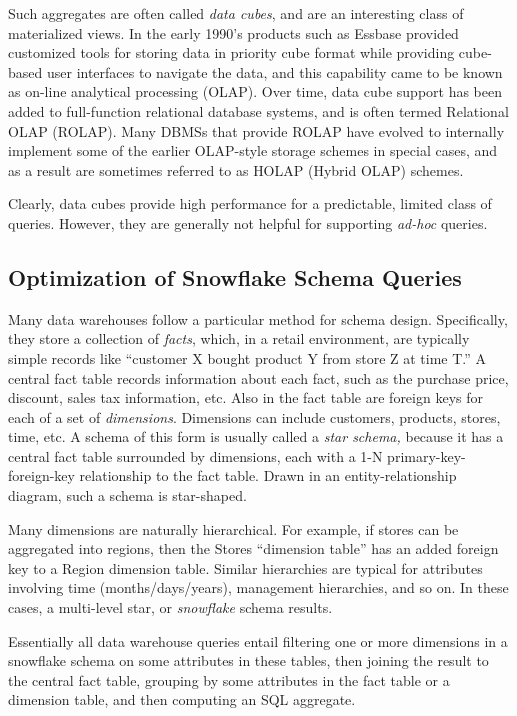 \documentclass[b5paper,11pt,twoside,openright]{book}
\begin{document}
Such aggregates are often called \emph{data cubes}, and are an
interesting class of materialized views. In the early 1990's products
such as Essbase provided customized tools for storing data in priority
cube format while providing cube-based user interfaces to navigate the
data, and this capability came to be known as on-line analytical
processing (OLAP). Over time, data cube support has been added to
full-function relational database systems, and is often termed
Relational OLAP (ROLAP). Many DBMSs that provide ROLAP have evolved to
internally implement some of the earlier OLAP-style storage schemes in
special cases, and as a result are sometimes referred to as HOLAP
(Hybrid OLAP) schemes.

Clearly, data cubes provide high performance for a predictable, limited
class of queries. However, they are generally not helpful for
supporting \emph{ad-hoc} queries.

\hypertarget{optimization-of-snowflake-schema-queries}{%
\subsection{Optimization of Snowflake Schema
Queries}\label{optimization-of-snowflake-schema-queries}}

Many data warehouses follow a particular method for schema design.
Specifically, they store a collection of \emph{facts}, which, in a
retail environment, are typically simple records like ``customer X
bought product Y from store Z at time T.'' A central fact table records
information about each fact, such as the purchase price, discount, sales
tax information, etc. Also in the fact table are foreign keys for each
of a set of \emph{dimensions}. Dimensions can include customers,
products, stores, time, etc. A schema of this form is usually called a
\emph{star schema,} because it has a central fact table surrounded by
dimensions, each with a 1-N primary-key-foreign-key relationship to the
fact table. Drawn in an entity-relationship diagram, such a schema is
star-shaped.

Many dimensions are naturally hierarchical. For example, if stores can
be aggregated into regions, then the Stores ``dimension table'' has an
added foreign key to a Region dimension table. Similar hierarchies are
typical for attributes involving time (months/days/years), management
hierarchies, and so on. In these cases, a multi-level star, or
\emph{snowflake} schema results.

Essentially all data warehouse queries entail filtering one or more
dimensions in a snowflake schema on some attributes in these tables,
then joining the result to the central fact table, grouping by some
attributes in the fact table or a dimension table, and then computing an
SQL aggregate.
\end{document}
